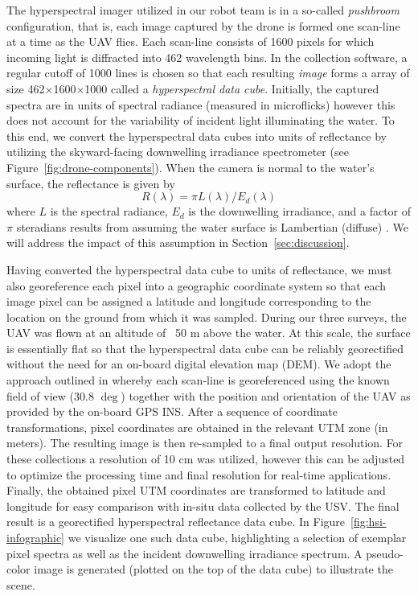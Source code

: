 \documentclass[sensors,article,submit,pdftex,moreauthors]{Definitions/mdpi}
\begin{document}
The hyperspectral imager utilized in our robot team is in a so-called \textit{pushbroom} configuration, that is, each image captured by the drone is formed one scan-line at a time as the UAV flies. Each scan-line consists of 1600 pixels for which incoming light is diffracted into 462 wavelength bins. In the collection software, a regular cutoff of 1000 lines is chosen so that each resulting \textit{image} forms a array of size 462$\times$1600$\times$1000 called a \textit{hyperspectral data cube}. Initially, the captured spectra are in units of spectral radiance (measured in microflicks) however this does not account for the variability of incident light illuminating the water. To this end, we convert the hyperspectral data cubes into units of reflectance by utilizing the skyward-facing downwelling irradiance spectrometer (see Figure~\ref{fig:drone-components}). When the camera is normal to the water's surface, the reflectance is given by
\begin{equation}
    R(\lambda) = \pi L(\lambda)/E_d(\lambda)
\end{equation}
where $L$ is the spectral radiance, $E_d$ is the downwelling irradiance, and a factor of $\pi$ steradians results from assuming the water surface is Lambertian (diffuse) \cite{reflectance-conversion}. We will address the impact of this assumption in Section~\ref{sec:discussion}.

Having converted the hyperspectral data cube to units of reflectance, we must also georeference each pixel into a geographic coordinate system so that each image pixel can be assigned a latitude and longitude corresponding to the location on the ground from which it was sampled. During our three surveys, the UAV was flown at an altitude of ~50 m above the water. At this scale, the surface is essentially flat so that the hyperspectral data cube can be reliably georectified without the need for an on-board digital elevation map (DEM). We adopt the approach outlined in \cite{GeorectificationMuller, GeorectificationBaumker, GeorectificationMostafa} whereby each scan-line is georeferenced using the known field of view (30.8 $\deg$) together with the position and orientation of the UAV as provided by the on-board GPS INS. After a sequence of coordinate transformations, pixel coordinates are obtained in the relevant UTM zone (in meters). The resulting image is then re-sampled to a final output resolution. For these collections a resolution of 10 cm was utilized, however this can be adjusted to optimize the processing time and final resolution for real-time applications. Finally, the obtained pixel UTM coordinates are transformed to latitude and longitude for easy comparison with in-situ data collected by the USV. The final result is a georectified hyperspectral reflectance data cube. In Figure~\ref{fig:hsi-infographic} we visualize one such data cube, highlighting a selection of exemplar pixel spectra as well as the incident downwelling irradiance spectrum. A pseudo-color image is generated (plotted on the top of the data cube) to illustrate the scene.
\end{document}

